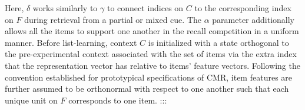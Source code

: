 {}Here, $\delta$ works similarly to $\gamma$ to connect indices on $C$ to the corresponding index on $F$ during retrieval from a partial or mixed cue. The $\alpha$ parameter additionally allows all the items to support one another in the recall competition in a uniform manner.\markdownRendererInterblockSeparator
{}Before list-learning, context $C$ is initialized with a state orthogonal to the pre-experimental context associated with the set of items via the extra index that the representation vector has relative to items' feature vectors. Following the convention established for prototypical specifications of CMR, item features are further assumed to be orthonormal with respect to one another such that each unique unit on $F$ corresponds to one item. :::\relax